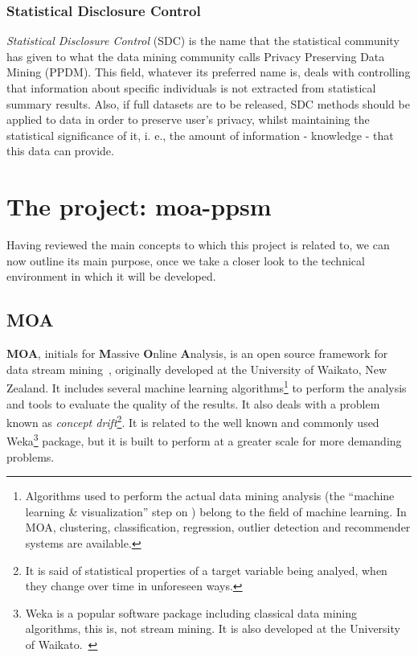 \subsubsection{Statistical Disclosure Control}

\textit{Statistical Disclosure Control} (SDC) is the name that the statistical community
has given to what the data mining community calls Privacy Preserving Data Mining (PPDM).
This field, whatever its preferred name is, deals with controlling that information about
specific individuals is not extracted from statistical summary results. Also, if full
datasets are to be released, SDC methods should be applied to data in order to preserve
user's privacy, whilst maintaining the statistical significance of it, i. e., the amount
of information - knowledge - that this data can provide.

\section{The project: moa-ppsm}
\label{Introduction::moa-ppsm}

Having reviewed the main concepts to which this project is related to, we can now outline
its main purpose, once we take a closer look to the technical environment in which it
will be developed.

\subsection{MOA}
\label{Introduction::moa-ppsm::MOA}

\textbf{MOA}, initials for \textbf{M}assive \textbf{O}nline \textbf{A}nalysis, is an
open source framework for data stream mining~\citep{web:MOA}, originally
developed at the University of Waikato, New Zealand. It includes several machine learning
algorithms\footnote{Algorithms used to perform the actual data mining analysis (the
“machine learning \& visualization” step on ) belong to the
field of machine learning. In MOA, clustering, classification, regression, outlier
detection and recommender systems are available.} to perform the analysis and tools
to evaluate the quality of the results. It also deals with a problem known as
\textit{concept drift}\footnote{It is said of statistical properties of a target variable
being analyed, when they change over time in unforeseen ways.}. It is related to the well
known and commonly used Weka\footnote{Weka is a popular software package including
classical data mining algorithms, this is, not stream mining. It is also developed at
the University of Waikato.~\citep{web:Weka}} package, but it is built to perform at
a greater scale for more demanding problems.

